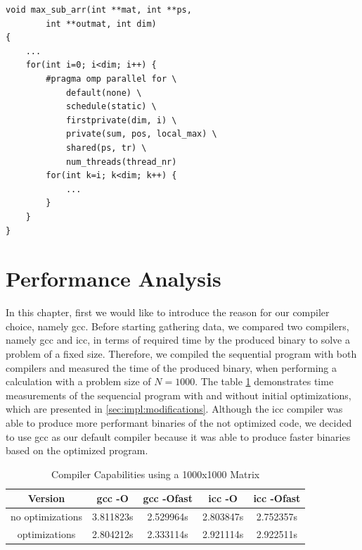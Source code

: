 \documentclass[conference]{IEEEtran}
\begin{document}
\begin{center}
   \begin{lstlisting}[captionpos=b, caption=OpenMP: Parallel Main Algorithm - Second Approach, label=lst:alg2]  
void max_sub_arr(int **mat, int **ps,                                                  
        int **outmat, int dim)                                                   
{                                                              
    ...                                        
    for(int i=0; i<dim; i++) {                                 
        #pragma omp parallel for \                             
            default(none) \                                    
            schedule(static) \                                 
            firstprivate(dim, i) \                             
            private(sum, pos, local_max) \                     
            shared(ps, tr) \                                   
            num_threads(thread_nr)                                                                                          
        for(int k=i; k<dim; k++) { 
            ...
        }
    }
}
   \end{lstlisting}
\end{center}



\section{Performance Analysis}
\label{sec:analysis}
In this chapter, first we would like to introduce the reason for our compiler choice, namely gcc. Before starting gathering data, we compared two compilers, namely gcc and icc, in terms of required time by the produced binary to solve a problem of a fixed size. Therefore, we compiled the sequential program with both compilers and measured the time of the produced binary, when performing a calculation with a problem size of $N=1000$. The table \ref{table:compiler} demonstrates time measurements of the sequencial program with and without initial optimizations, which are presented in \ref{sec:impl:modifications}. Although the icc compiler was able to produce more performant binaries of the not optimized code, we decided to use gcc as our default compiler because it was able to produce faster binaries based on the optimized program. 

\begin{table}[!t]
\renewcommand{\arraystretch}{1.3}
\caption{Compiler Capabilities using a 1000x1000 Matrix}
\label{table:compiler}
\centering
\begin{tabular}{|c||c|c|c|c|}
\hline
Version & gcc -O & gcc -Ofast & icc -O & icc -Ofast \\
\hline
no optimizations & 3.811823s & 2.529964s & 2.803847s & 2.752357s \\
\hline
optimizations & 2.804212s & 2.333114s & 2.921114s & 2.922511s \\
\hline
\end{tabular}
\end{table}
\end{document}
